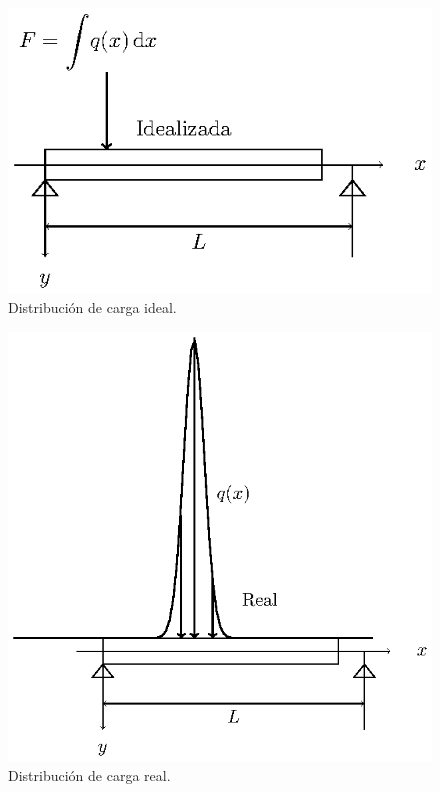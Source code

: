 \documentclass[12pt]{article}
\numberwithin{equation}{section}
\begin{document}
\begin{figure}[H]
    \centering
    \includegraphics[scale=1.3]{Imagenes/delta_Dirac_02a.eps}
    \caption{Distribución de carga ideal.}
    \label{fig:figura_delta_Dirac_02}
\end{figure}
\begin{figure}[H]
    \centering
    \includegraphics[scale=0.85]{Imagenes/delta_Dirac_02b.eps}
    \caption{Distribución de carga real.}
    \label{fig:figura_delta_Dirac_05}
\end{figure}
\end{document}
